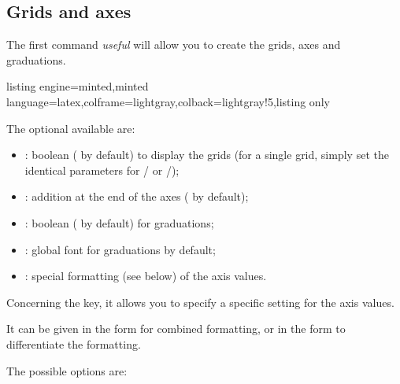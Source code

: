 \documentclass[11pt,a4paper]{ltxdoc}
\begin{document}
\pagebreak

\subsection{Grids and axes}\label{creaaxesgr}

The first command \textit{useful} will allow you to create the grids, axes and graduations.

\begin{tcblisting}{listing engine=minted,minted language=latex,colframe=lightgray,colback=lightgray!5,listing only}
\end{tcblisting}

The optional \MontreCode{[keys]} available are:

\smallskip

\begin{itemize}
	\item {}: boolean ( by default) to display the grids (for a single grid, simply set the identical parameters for / or /);
	\item {}: addition at the end of the axes ( by default);
	\item {}: boolean ( by default) for graduations;
	\item {}: global font for graduations { by default};
	\item {}: special formatting (see below) of the axis values.
\end{itemize}

\smallskip

Concerning the  key, it allows you to specify a specific setting for the axis values.

\smallskip

It can be given in the form  for combined formatting, or in the form  to differentiate the formatting.

\smallskip

The possible options are:

\smallskip
\end{document}
